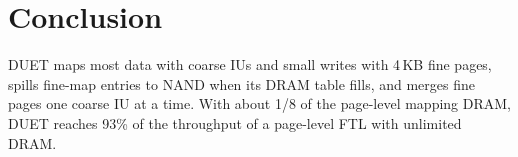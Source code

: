 \section{Conclusion}
\label{sec:conclusion}
DUET maps most data with coarse IUs and small writes with 4\,KB fine pages, spills
fine-map entries to NAND when its DRAM table fills, and merges fine pages one coarse
IU at a time. With about 1/8 of the page-level mapping DRAM, DUET reaches 93\% of the
throughput of a page-level FTL with unlimited DRAM.
